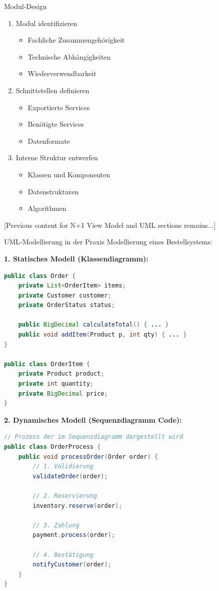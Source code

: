 \begin{KR}{Modul-Design}
\begin{enumerate}
    \item Modul identifizieren
    \begin{itemize}
        \item Fachliche Zusammengehörigkeit
        \item Technische Abhängigkeiten
        \item Wiederverwendbarkeit
    \end{itemize}
    
    \item Schnittstellen definieren
    \begin{itemize}
        \item Exportierte Services
        \item Benötigte Services
        \item Datenformate
    \end{itemize}
    
    \item Interne Struktur entwerfen
    \begin{itemize}
        \item Klassen und Komponenten
        \item Datenstrukturen
        \item Algorithmen
    \end{itemize}
\end{enumerate}
\end{KR}

[Previous content for N+1 View Model and UML sections remains...]

\begin{example}{UML-Modellierung in der Praxis}
Modellierung eines Bestellsystems:

\textbf{1. Statisches Modell (Klassendiagramm):}
\begin{lstlisting}[language=Java]
public class Order {
    private List<OrderItem> items;
    private Customer customer;
    private OrderStatus status;
    
    public BigDecimal calculateTotal() { ... }
    public void addItem(Product p, int qty) { ... }
}

public class OrderItem {
    private Product product;
    private int quantity;
    private BigDecimal price;
}
\end{lstlisting}

\textbf{2. Dynamisches Modell (Sequenzdiagramm Code):}
\begin{lstlisting}[language=Java]
// Prozess der im Sequenzdiagramm dargestellt wird
public class OrderProcess {
    public void processOrder(Order order) {
        // 1. Validierung
        validateOrder(order);
        
        // 2. Reservierung
        inventory.reserve(order);
        
        // 3. Zahlung
        payment.process(order);
        
        // 4. Bestätigung
        notifyCustomer(order);
    }
}
\end{lstlisting}
\end{example}

